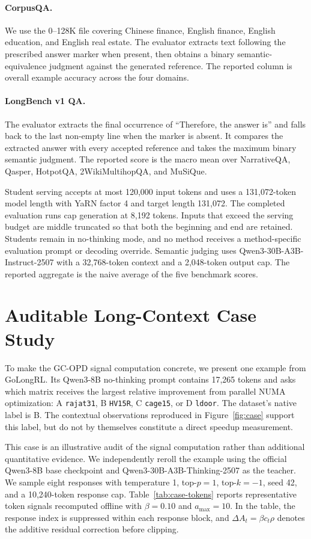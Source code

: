 \paragraph{CorpusQA.}
We use the 0--128K file covering Chinese finance, English finance, English
education, and English real estate. The evaluator extracts text following the
prescribed answer marker when present, then obtains a binary
semantic-equivalence judgment against the generated reference. The reported
column is overall example accuracy across the four domains.

\paragraph{LongBench v1 QA.}
The evaluator extracts the final occurrence of ``Therefore, the answer is''
and falls back to the last non-empty line when the marker is absent. It compares
the extracted answer with every accepted reference and takes the maximum binary
semantic judgment. The reported score is the macro mean over NarrativeQA,
Qasper, HotpotQA, 2WikiMultihopQA, and MuSiQue.

Student serving accepts at most 120,000 input tokens and uses a 131,072-token
model length with YaRN factor 4 and target length 131,072. The completed
evaluation runs cap generation at 8,192 tokens. Inputs that exceed the serving
budget are middle truncated so that both the beginning and end are retained.
Students remain in no-thinking mode, and no method receives a method-specific
evaluation prompt or decoding override. Semantic judging uses
Qwen3-30B-A3B-Instruct-2507 with a 32,768-token context and a 2,048-token
output cap. The reported aggregate is the naive average of the five benchmark
scores.

\section{Auditable Long-Context Case Study}

To make the GC-OPD signal computation concrete, we present one example from
GoLongRL. Its Qwen3-8B no-thinking prompt contains 17,265 tokens and asks which
matrix receives the largest relative improvement from parallel NUMA
optimization: A \texttt{rajat31}, B \texttt{HV15R}, C \texttt{cage15}, or D
\texttt{ldoor}. The dataset's native label is B. The contextual observations
reproduced in Figure~\ref{fig:case} support this label, but do not by themselves
constitute a direct speedup measurement.

This case is an illustrative audit of the signal computation rather than
additional quantitative evidence. We independently reroll the example using
the official Qwen3-8B base checkpoint and Qwen3-30B-A3B-Thinking-2507 as the
teacher. We sample eight responses with temperature 1, top-$p=1$, top-$k=-1$,
seed 42, and a 10,240-token response cap.
Table~\ref{tab:case-tokens} reports representative token signals recomputed
offline with $\beta=0.10$ and $a_{\max}=10$. In the table, the response index
is suppressed within each response block, and
$\Delta A_t=\beta c_t\rho$ denotes the additive residual correction before
clipping.

